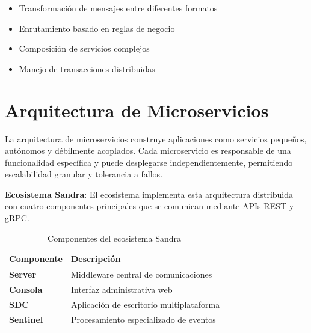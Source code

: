\documentclass[11pt, spanish, letterpaper, twocolumn]{book}
\begin{document}
\begin{itemize}
    \item Transformación de mensajes entre diferentes formatos
    \item Enrutamiento basado en reglas de negocio
    \item Composición de servicios complejos
    \item Manejo de transacciones distribuidas
\end{itemize}

\section{Arquitectura de Microservicios}

La arquitectura de microservicios construye aplicaciones como servicios pequeños, autónomos y débilmente acoplados. Cada microservicio es responsable de una funcionalidad específica y puede desplegarse independientemente, permitiendo escalabilidad granular y tolerancia a fallos.

\begin{cajaestandar}
    \textbf{Ecosistema Sandra}: El ecosistema implementa esta arquitectura distribuida con cuatro componentes principales que se comunican mediante APIs REST y gRPC.
\end{cajaestandar}

\begin{table}[H]
    \centering
    \caption{Componentes del ecosistema Sandra}
    \begin{tabular}{lp{6cm}}
        \toprule
        \textbf{Componente} & \textbf{Descripción} \\
        \midrule
        \textbf{Server} & Middleware central de comunicaciones \\
        \textbf{Consola} & Interfaz administrativa web \\
        \textbf{SDC} & Aplicación de escritorio multiplataforma \\
        \textbf{Sentinel} & Procesamiento especializado de eventos \\
        \bottomrule
    \end{tabular}
    \label{tab:componentes}
\end{table}

\end{document}
